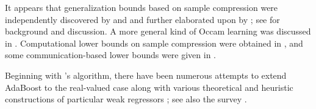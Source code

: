 It appears that
generalization bounds
based on sample compression
were
independently discovered by
\citet{Littlestone86relatingdata} and \citet{MR1383093}
and further elaborated upon by \citet{DBLP:journals/ml/GraepelHS05};
see \citet{DBLP:journals/ml/FloydW95} for background and discussion.
A more general kind of Occam learning was discussed in \citet{MR1072253}.
Computational lower bounds on sample compression were
obtained in \citet{gottlieb2014near},
and some communication-based
lower bounds
were given in
\citet{DBLP:journals/corr/abs-1711-05893}.

\begin{sloppypar}
Beginning with \citet{FreundSchapire97}'s 
algorithm, there have been numerous attempts to extend
AdaBoost to the real-valued case
\citep{bertoni1997boosting,Drucker:1997:IRU:645526.657132,avnimelech1999boosting,Karakoulas00,DuffyHelmbold02,kegl2003robust,NOCK200725}
along with various theoretical and heuristic
constructions of particular weak regressors
\citep{Mason1999,MR1873328,DBLP:journals/ml/MannorM02};
see also the survey \citet{Mendes-Moreira2012}.
\end{sloppypar}



